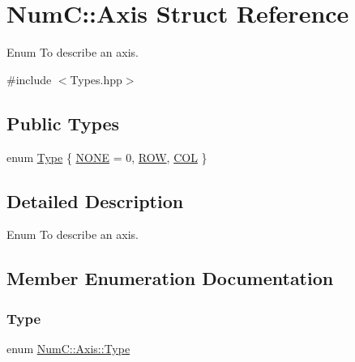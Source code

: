 \hypertarget{struct_num_c_1_1_axis}{}\section{NumC\+:\+:Axis Struct Reference}
\label{struct_num_c_1_1_axis}


Enum To describe an axis.  




{\ttfamily \#include $<$Types.\+hpp$>$}

\subsection*{Public Types}
\begin{DoxyCompactItemize}
\item 
enum \mbox{\hyperlink{struct_num_c_1_1_axis_a8e689044ef1941a03482e730c5e7ebb3}{Type}} \{ \mbox{\hyperlink{struct_num_c_1_1_axis_a8e689044ef1941a03482e730c5e7ebb3a0ae033c4226f7184bf0050b101e7ed94}{N\+O\+NE}} = 0, 
\mbox{\hyperlink{struct_num_c_1_1_axis_a8e689044ef1941a03482e730c5e7ebb3a392f74a34b6718b6d219cb2a08894feb}{R\+OW}}, 
\mbox{\hyperlink{struct_num_c_1_1_axis_a8e689044ef1941a03482e730c5e7ebb3a4d8767b101b6e5a365cb442a10b9bcd4}{C\+OL}}
 \}
\end{DoxyCompactItemize}


\subsection{Detailed Description}
Enum To describe an axis. 

\subsection{Member Enumeration Documentation}
\mbox{\label{struct_num_c_1_1_axis_a8e689044ef1941a03482e730c5e7ebb3}} 
\subsubsection{\texorpdfstring{Type}{Type}}
{\footnotesize\ttfamily enum \mbox{\hyperlink{struct_num_c_1_1_axis_a8e689044ef1941a03482e730c5e7ebb3}{Num\+C\+::\+Axis\+::\+Type}}}

